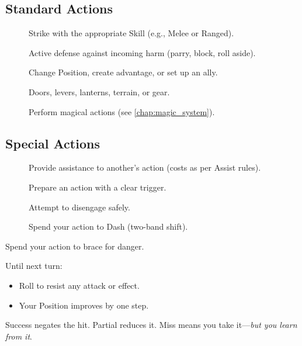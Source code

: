 \subsection{Standard Actions}\label{subsec:standard_actions}
\begin{description}
    \item[] Strike with the appropriate Skill (e.g., Melee or Ranged).
    \item[] Active defense against incoming harm (parry, block, roll aside).
    \item[] Change Position, create advantage, or set up an ally.
    \item[] Doors, levers, lanterns, terrain, or gear.
    \item[] Perform magical actions (see \autoref{chap:magic_system}).
\end{description}

\subsection{Special Actions}\label{subsec:special_actions}
\begin{description}
    \item[] Provide assistance to another's action (costs as per Assist rules).
    \item[] Prepare an action with a clear trigger.
    \item[] Attempt to disengage safely.
    \item[] Spend your action to Dash (two-band shift).
\end{description}

\begin{tcolorbox}[title={Quick Rule: Defend},colback=blue!5!white,colframe=blue!75!black,breakable]
Spend your action to brace for danger.

Until next turn:
\begin{itemize}
    \item Roll to resist any attack or effect.
    \item Your Position improves by one step.
\end{itemize}
Success negates the hit. Partial reduces it. Miss means you take it---\emph{but you learn from it}.
\end{tcolorbox}

